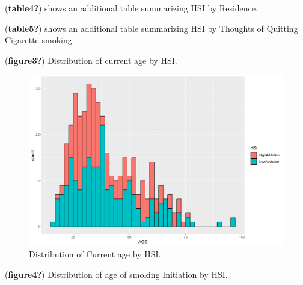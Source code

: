 \documentclass[
  letterpaper,
  DIV=11,
  numbers=noendperiod]{scrartcl}
\begin{document}
(\textbf{table4?}) shows an additional table summarizing HSI by
Residence.

\begin{table}

\end{table}

(\textbf{table5?}) shows an additional table summarizing HSI by Thoughts
of Quitting Cigarette smoking.

\begin{table}

\end{table}

(\textbf{figure3?}) Distribution of current age by HSI.

\begin{figure}

{\centering \includegraphics[width=9.44in,height=\textheight]{../../../results/figure3.png}

}

\caption{\label{fig-figure3}Distribution of Current age by HSI.}

\end{figure}

(\textbf{figure4?}) Distribution of age of smoking Initiation by HSI.
\end{document}

